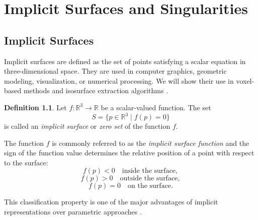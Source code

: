 \documentclass[12pt, a4paper, oneside]{book}
\theoremstyle{plain}
\theoremstyle{definition}
\newtheorem{definition}[theorem]{Definition}
\theoremstyle{remark}
\theoremstyle{definition}
\begin{document}


\newpage
\chapter{Implicit Surfaces and Singularities}


\section{Implicit Surfaces}
Implicit surfaces are defined as the set of points satisfying a scalar equation in three-dimensional space. They are used in computer graphics, geometric modeling, visualization, or numerical processing. We will show their use in voxel-based methods and isosurface extraction algorithms \cite{bloomenthal2000implicit}.

\begin{definition}
Let $f : \mathbb{R}^3 \to \mathbb{R}$ be a scalar-valued function. The set
\[
S = \{ p \in \mathbb{R}^3 \mid f(p) = 0 \}
\]
is called an \emph{implicit surface} or \emph{zero set} of the function $f$.
\end{definition}

The function $f$ is commonly referred to as the \emph{implicit surface function} and the sign of the function value determines the relative position of a point with respect to the surface:
\[
f(p) < 0 \quad \text{inside the surface},
\]
\[
f(p) > 0 \quad \text{outside the surface},
\]
\[
f(p) = 0 \quad \text{on the surface}.
\]

This classification property is one of the major advantages of implicit representations over parametric approaches \cite{bloomenthal2000implicit}.
\end{document}
